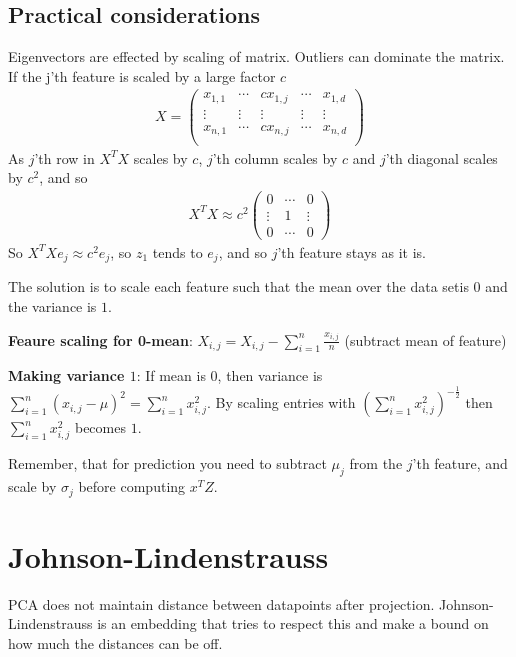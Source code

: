\documentclass{article}
\begin{document}
  \subsection{Practical considerations}
    Eigenvectors are effected by scaling of matrix. Outliers can dominate the matrix. If the j'th feature is scaled by a large factor $c$ 
    \begin{align}
      X = \begin{pmatrix}
        x_{1, 1} & \cdots & cx_{1, j} & \cdots & x_{1, d} \\
        \vdots & \vdots & \vdots & \vdots  & \vdots \\
        x_{n, 1} & \cdots & cx_{n, j} & \cdots & x_{n, d} \\
      \end{pmatrix}
    \end{align}
    As $j$'th row in $X^TX$ scales by $c$, $j$'th column scales by $c$ and $j$'th diagonal scales by $c^2$, and so 
    \begin{align}
      X^TX \approx c^2 \begin{pmatrix}
        0 & \cdots & 0\\
        \vdots & 1 & \vdots\\
        0 & \cdots & 0
      \end{pmatrix}
    \end{align}
    So $X^TX e_j \approx c^2 e_j$, so $z_1$ tends to $e_j$, and so $j$'th feature stays as it is.
    
    The solution is to scale each feature such that the mean over the data setis $0$ and the variance is $1$. 
    
    \textbf{Feaure scaling for 0-mean}: $X_{i, j} = X_{i, j} - \sum_{i=1}^{n}{\frac{x_{i,j}}{n}}$ (subtract mean of feature)
    
    \textbf{Making variance $1$}: If mean is $0$, then variance is $\sum_{i=1}^{n}{(x_{i, j}-\mu)^2} = \sum_{i=1}^{n}{x_{i,j}^2}$. By scaling entries with $(\sum_{i=1}^{n}{x_{i,j}^2})^{-\frac{1}{2}}$ then $\sum_{i=1}^{n}{x_{i,j}^2}$ becomes $1$. 
    
    Remember, that for prediction you need to subtract $\mu_j$ from the $j$'th feature, and scale by $\sigma_j$ before computing $x^T Z$.


  
\section{Johnson-Lindenstrauss}
  PCA does not maintain distance between datapoints after projection. Johnson-Lindenstrauss is an embedding that tries to respect this and make a bound on how much the distances can be off. 
\end{document}
